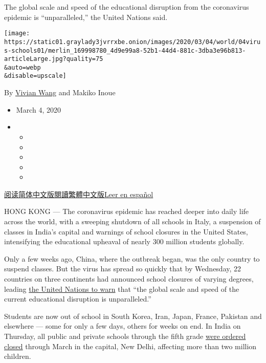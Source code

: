 The global scale and speed of the educational disruption from the
coronavirus epidemic is ``unparalleled,'' the United Nations said.

\texttt{[image: https://static01.graylady3jvrrxbe.onion/images/2020/03/04/world/04virus-schools01/merlin\_169998780\_4d9e99a8-52b1-44d4-881c-3dba3e96b813-articleLarge.jpg?quality=75\\\&auto=webp\\\&disable=upscale]}

By \href{https://www.nytimes3xbfgragh.onion/by/vivian-wang}{Vivian Wang}
and Makiko Inoue

\begin{itemize}
\item
  March 4, 2020
\item
  \begin{itemize}
  \item
  \item
  \item
  \item
  \item
  \end{itemize}
\end{itemize}

\href{https://cn.nytimes3xbfgragh.onion/education/20200305/coronavirus-schools-closed/}{阅读简体中文版}\href{https://cn.nytimes3xbfgragh.onion/education/20200305/coronavirus-schools-closed/zh-hant/}{閱讀繁體中文版}\href{https://www.nytimes3xbfgragh.onion/es/2020/03/05/espanol/mundo/suspension-clases-coronavirus.html}{Leer
en español}

HONG KONG --- The coronavirus epidemic has reached deeper into daily
life across the world, with a sweeping shutdown of all schools in Italy,
a suspension of classes in India's capital and warnings of school
closures in the United States, intensifying the educational upheaval of
nearly 300 million students globally.

Only a few weeks ago, China, where the outbreak began, was the only
country to suspend classes. But the virus has spread so quickly that by
Wednesday, 22 countries on three continents had announced school
closures of varying degrees, leading
\href{https://en.unesco.org/news/290-million-students-out-school-due-covid-19-unesco-releases-first-global-numbers-and-mobilizes}{the
United Nations to warn} that ``the global scale and speed of the current
educational disruption is unparalleled.''

Students are now out of school in South Korea, Iran, Japan, France,
Pakistan and elsewhere --- some for only a few days, others for weeks on
end. In India on Thursday, all public and private schools through the
fifth grade
\href{https://www.nytimes3xbfgragh.onion/2020/03/05/world/coronavirus-news.html?action=click\&module=Top\%20Stories\&pgtype=Homepage\#link-4c11ca8b}{were
ordered closed} through March in the capital, New Delhi, affecting more
than two million children.

